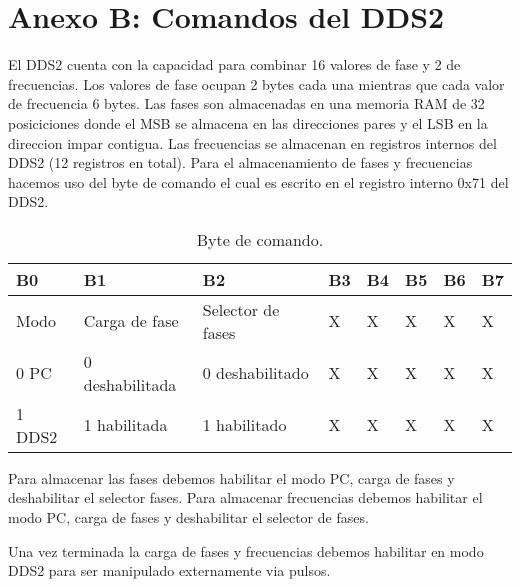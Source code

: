 \section{Anexo B: Comandos del DDS2}
El DDS2 cuenta con la capacidad para combinar 16 valores de fase y 2 de frecuencias.
Los valores de fase ocupan 2 bytes cada una mientras que cada valor de frecuencia 6 bytes.
Las fases son almacenadas en una memoria RAM de 32 posiciciones donde el MSB se
almacena en las direcciones pares y el LSB en la direccion impar contigua.
Las frecuencias se almacenan en registros internos del DDS2 (12 registros en total).
Para el almacenamiento de fases y frecuencias hacemos uso del byte de comando
el cual es escrito en el registro interno 0x71 del DDS2. 

\begin{table}[ht]
    \centering
    \begin{tabular}{|l|l|l|l|l|l|l|l|}
    \hline 
    B0 & B1 & B2 & B3 & B4 & B5 & B6 & B7 \\
    \hline
    Modo   & Carga de fase    & Selector de fases & X & X & X & X & X\\
    \hline
    0 PC   & 0 deshabilitada  & 0 deshabilitado   & X & X & X & X & X\\
    1 DDS2 & 1 habilitada     & 1 habilitado      & X & X & X & X & X\\
    \hline
\end{tabular}
\caption{\label{tab:dds2_byte_comando}Byte de comando.}
\end{table}

Para almacenar las fases debemos habilitar el modo PC, carga de fases y deshabilitar el selector fases.
Para almacenar frecuencias debemos habilitar el modo PC, carga de fases y deshabilitar el selector de fases.

Una vez terminada la carga de fases y frecuencias debemos habilitar en modo DDS2 para
ser manipulado externamente via pulsos.

